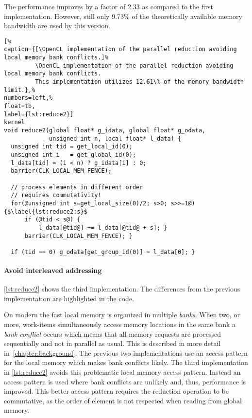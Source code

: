 The performance improves by a factor of 2.33 as compared to the first implementation.
However, still only 9.73\% of the theoretically available memory bandwidth are used by this version.


\FloatBarrier
\begin{lstlisting}[%
caption={[\OpenCL implementation of the parallel reduction avoiding local memory bank conflicts.]%
         \OpenCL implementation of the parallel reduction avoiding local memory bank conflicts.
         This implementation utilizes 12.61\% of the memory bandwidth limit.},%
numbers=left,%
float=tb,
label={lst:reduce2}]
kernel
void reduce2(global float* g_idata, global float* g_odata,
             unsigned int n, local float* l_data) {
  unsigned int tid = get_local_id(0);
  unsigned int i   = get_global_id(0);
  l_data[tid] = (i < n) ? g_idata[i] : 0;
  barrier(CLK_LOCAL_MEM_FENCE);

  // process elements in different order
  // requires commutativity!
  for(@unsigned int s=get_local_size(0)/2; s>0; s>>=1@) {$\label{lst:reduce2:s}$
      if (@tid < s@) {
          l_data[@tid@] += l_data[@tid@ + s]; }
      barrier(CLK_LOCAL_MEM_FENCE); }

  if (tid == 0) g_odata[get_group_id(0)] = l_data[0]; }
\end{lstlisting}

\paragraph{Avoid interleaved addressing}

\autoref{lst:reduce2} shows the third implementation.
The differences from the previous implementation are highlighted in the code.

On modern \GPUs the fast local memory is organized in multiple \emph{banks}.
When two, or more, work-items simultaneously access memory locations in the same bank a \emph{bank conflict} occurs which means that all memory requests are processed sequentially and not in parallel as usual.
This is described in more detail in~\autoref{chapter:background}.
The previous two implementations use an access pattern for the local memory which makes bank conflicts likely.
The third implementation in \autoref{lst:reduce2} avoids this problematic local memory access pattern.
Instead an access pattern is used where bank conflicts are unlikely and, thus, performance is improved.
This better access pattern requires the reduction operation to be commutative, as the order of element is not respected when reading from global memory.

